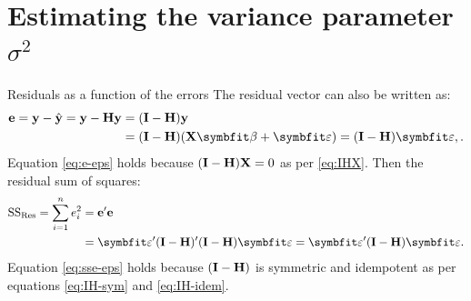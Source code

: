 \section{Estimating the variance parameter \texorpdfstring{$\sigma^2$}{sigma squared}}




\begin{frame}{Residuals as a function of the errors}
    The residual vector can also be written as:
    \begin{align}
        \be = \by - \hat{\by} = \by - \bH \by &= (\bI-\bH)\by \notag \\
        &= (\bI-\bH)(\bX\bbeta+\bvarepsilon) = (\bI-\bH)\bvarepsilon, \label{eq:e-eps}.
    \end{align}
    Equation \eqref{eq:e-eps} holds because \((\mathbf{I}-\mathbf{H}) \mathbf{X} = 0\) as per \eqref{eq:IHX}.
    Then the residual sum of squares:
    \begin{align}
        \SSRes = \sum_{i=1}^{n} e_i^2 &= \be'\be \notag \notag \\
        &= \bvarepsilon' (\bI-\bH)' (\bI-\bH) \bvarepsilon = \bvarepsilon' (\bI-\bH) \bvarepsilon. \label{eq:sse-eps}
    \end{align}
    Equation \eqref{eq:sse-eps} holds because \((\mathbf{I}-\mathbf{H})\) is symmetric and idempotent as per equations \eqref{eq:IH-sym} and \eqref{eq:IH-idem}.
\end{frame}



